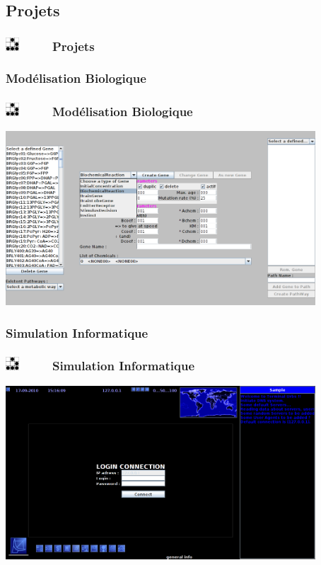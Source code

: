 \documentclass[slidetop,11pt]{beamer}
\def\sectionPartIIc{Projets}
\def\sectionPartIIcUN{Mod{\'e}lisation Biologique}
\def\sectionPartIIcDE{Simulation Informatique}
\def\moreInFrameTitle{\includegraphics[height=0.5cm]{img/logo_glider.png}~~~~~}
\begin{document}
\subsection{\sectionPartIIc}
\begin{frame}
	\frametitle{\moreInFrameTitle \sectionPartIIc}
	\tableofcontents[sections=1,subsectionstyle=show/shaded/hide]
\end{frame}

\subsubsection{\sectionPartIIcUN}
\begin{frame}
	\frametitle{\moreInFrameTitle \sectionPartIIcUN}
	\begin{center}
	\includegraphics[height=6.5cm,width=11.6cm]{img/persoGeneCreatorGUI.png} 
	\end{center}
\end{frame}

\subsubsection{\sectionPartIIcDE}
\begin{frame}
	\frametitle{\moreInFrameTitle \sectionPartIIcDE}
	\begin{center}
	\includegraphics[height=6.5cm,width=11.6cm]{img/persoUplinkTerminalUrbs.png} 
	\end{center}
\end{frame}
\end{document}

